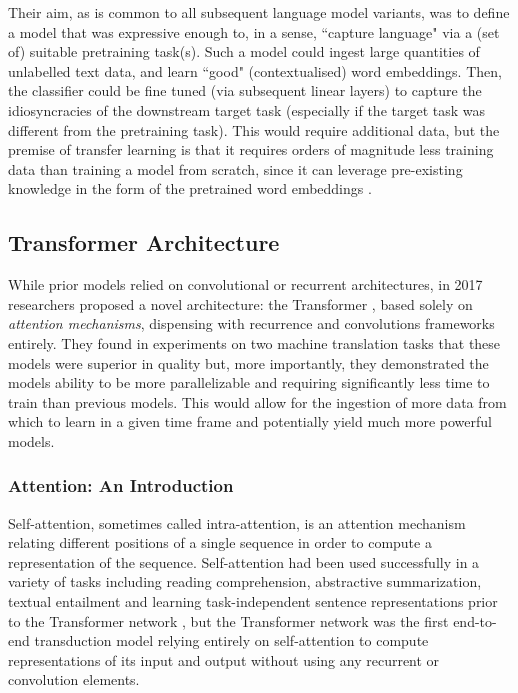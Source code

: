 {{Their aim, as is common to all subsequent language model variants, was to define a model that was expressive enough to, in a sense, ``capture language" via a (set of) suitable pretraining task(s). Such a model could ingest large quantities of unlabelled text data, and learn ``good" (contextualised) word embeddings. Then, the classifier could be fine tuned (via subsequent linear layers) to capture the idiosyncracies of the downstream target task (especially if the target task was different from the pretraining task). This would require additional data, but the premise of transfer learning is that it requires orders of magnitude less training data than training a model from scratch, since it can leverage pre-existing knowledge in the form of the pretrained word embeddings \cite{RuderThesis}.
\subsection{Transformer Architecture}
While prior models relied on convolutional or recurrent architectures, in 2017 researchers proposed a novel architecture: the Transformer \cite{Vaswani}, based solely on \textit{attention mechanisms}, dispensing with recurrence and convolutions frameworks entirely. They found in experiments on two machine translation tasks that these models were superior in quality but, more importantly, they demonstrated the models ability to be more parallelizable and requiring significantly less time to train than previous models. This would allow for the ingestion of more data from which to learn in a given time frame and potentially yield much more powerful models.

\subsubsection{Attention: An Introduction}
Self-attention, sometimes called intra-attention, is an attention mechanism relating different positions of a single sequence in order to compute a representation of the sequence. Self-attention had been used successfully in a variety of tasks including reading comprehension, abstractive summarization, textual entailment and learning task-independent sentence representations prior to the Transformer network \cite{Cheng2016, Parikh, Paulus2017, Lin2017}, but the Transformer network was the first end-to-end transduction model relying entirely on self-attention to compute representations of its input and output without using any recurrent or convolution elements.

}}
